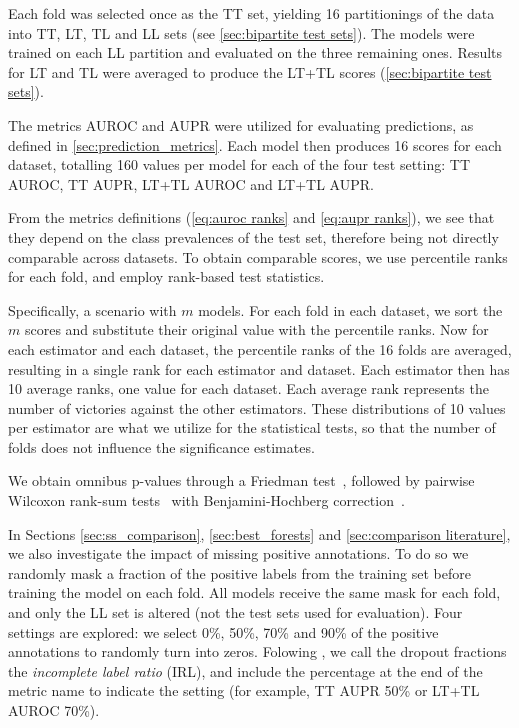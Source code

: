 Each fold was selected once as the TT set, yielding 16 partitionings of the data into TT, LT, TL and LL sets (see \autoref{sec:bipartite test sets}). The models were trained on each LL partition and evaluated on the three remaining ones. Results for LT and TL were averaged to produce the LT+TL scores (\autoref{sec:bipartite test sets}).

The metrics AUROC and AUPR were utilized for evaluating predictions, as defined in \autoref{sec:prediction_metrics}. Each model then produces 16 scores for each dataset, totalling 160 values per model for each of the four test setting: TT AUROC, TT AUPR, LT+TL AUROC and LT+TL AUPR.
 
From the metrics definitions (\autoref{eq:auroc ranks} and \autoref{eq:aupr ranks}), we see that they depend on the class prevalences of the test set, therefore being not directly comparable across datasets.
To obtain comparable scores, we use percentile ranks for each fold, and employ rank-based test statistics.

Specifically, a scenario with $m$ models. For each fold in each dataset, we sort the $m$ scores and substitute their original value with the percentile ranks.
Now for each estimator and each dataset, the percentile ranks of the 16 folds are averaged, resulting in a single rank for each estimator and dataset. Each estimator then has 10 average ranks, one value for each dataset. Each average rank represents the number of victories against the other estimators. These distributions of 10 values per estimator are what we utilize for the statistical tests, so that the number of folds does not influence the significance estimates.

We obtain omnibus p-values through a Friedman test~\cite{demsar2006statistical,benavoli2016should}, followed by pairwise Wilcoxon rank-sum tests~\cite{benavoli2016should} with Benjamini-Hochberg correction~\cite{benjamini1995controlling,haynes2013benjamini}.

In Sections \ref{sec:ss_comparison}, \ref{sec:best_forests} and \ref{sec:comparison literature}, we also investigate the impact of missing positive annotations. To do so we randomly mask a fraction of the positive labels from the training set before training the model on each fold.
All models receive the same mask for each fold, and only the LL set is altered (not the test sets used for evaluation).
Four settings are explored: we select 0\%, 50\%, 70\% and 90\% of the positive annotations to randomly turn into zeros.
Folowing , we call the dropout fractions the \emph{incomplete label ratio} (IRL), and include the percentage at the end of the metric name to indicate the setting (for example, TT AUPR 50\% or LT+TL AUROC 70\%).


